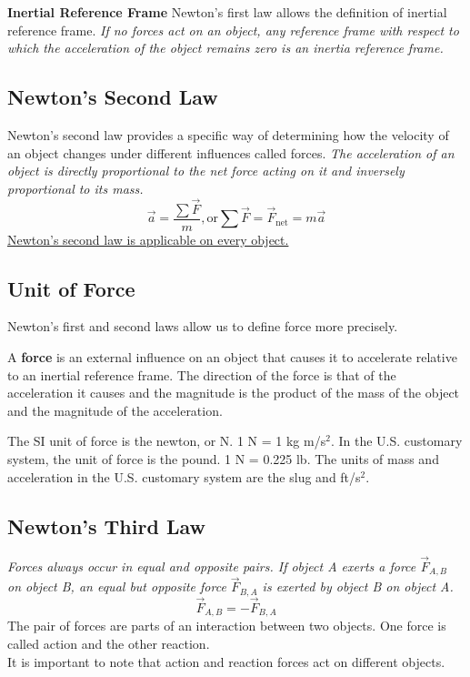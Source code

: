 \documentclass[11pt,a4paper]{report}
\begin{document}
\hspace{1mm}

\noindent
\textbf{Inertial Reference Frame} Newton's first law allows the definition of inertial reference frame. \emph{If no forces act on an object, any reference frame with respect to which the acceleration of the object remains zero is an inertia reference frame.}

\subsection{Newton's Second Law}
Newton's second law provides a specific way of determining how the velocity of an object changes under different influences called forces.
\emph{The acceleration of an object is directly proportional to the net force acting on it and inversely proportional to its mass.}
$$\vec{a} = \frac{\sum \vec{F}}{m} \mathrm{, or } \sum{\vec{F}} = \vec{F}_\mathrm{net} = m \vec{a}$$
\underline{Newton's second law is applicable on every object.}

\subsection{Unit of Force}
Newton's first and second laws allow us to define force more precisely.

\hspace{1mm}

\noindent
A \textbf{force} is an external influence on an object that causes it to accelerate relative to an inertial reference frame. The direction of the force is that of the acceleration it causes and the magnitude is the product of the mass of the object and the magnitude of the acceleration.

\hspace{1mm}

\noindent
The SI unit of force is the newton, or N. 1 N = 1 kg m/s$^2$. In the U.S. customary system, the unit of force is the pound. 1 N = 0.225 lb. The units of mass and acceleration in the U.S. customary system are the slug and ft/s$^2$.

\subsection{Newton's Third Law}
\emph{Forces always occur in equal and opposite pairs. If object A exerts a force $\vec{F}_{A, B}$ on object B, an equal but opposite force $\vec{F}_{B, A}$ is exerted by object B on object A.} $$\vec{F}_{A, B} = -\vec{F}_{B, A}$$
The pair of forces are parts of an interaction between two objects. One force is called action and the other reaction.
\\It is important to note that action and reaction forces act on different objects.
\end{document}
